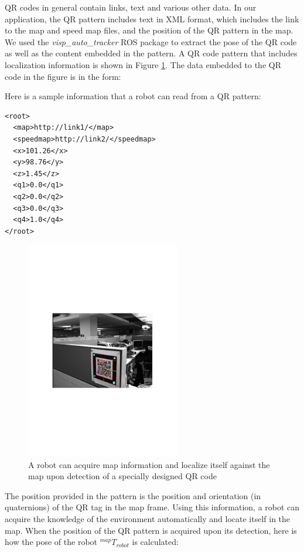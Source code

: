QR codes in general contain links, text and various other data. In our application, the QR pattern includes text in XML format, which includes the link to the map and speed map files, and the position of the QR pattern in the map. We used the \textit{visp\_auto\_tracker} ROS package to extract the pose of the QR code as well as the content embedded in the pattern. A QR code pattern that includes localization information is shown in Figure \ref{fig:qr}. The data embedded to the QR code in the figure is in the form:

Here is a sample information that a robot can read from a QR pattern:

\begin{lstlisting}
<root>
  <map>http://link1/</map>
  <speedmap>http://link2/</speedmap>
  <x>101.26</x>
  <y>98.76</y>
  <z>1.45</z>
  <q1>0.0</q1>
  <q2>0.0</q2>
  <q3>0.0</q3>
  <q4>1.0</q4>
</root>
\end{lstlisting}

\begin{figure}[ht!]
\centering
\includegraphics[width=0.6\textwidth]{pics/qrcode}
\caption{A robot can acquire map information and localize itself against the map upon detection of a specially designed QR code}
\label{fig:qr}
\end{figure}

The position provided in the pattern is the position and orientation (in quaternions) of the QR tag in the map frame. Using this information, a robot can acquire the knowledge of the environment automatically and locate itself in the map. When the position of the QR pattern is acquired upon its detection, here is how the pose of the robot $^{map}T_{robot}$ is calculated:

